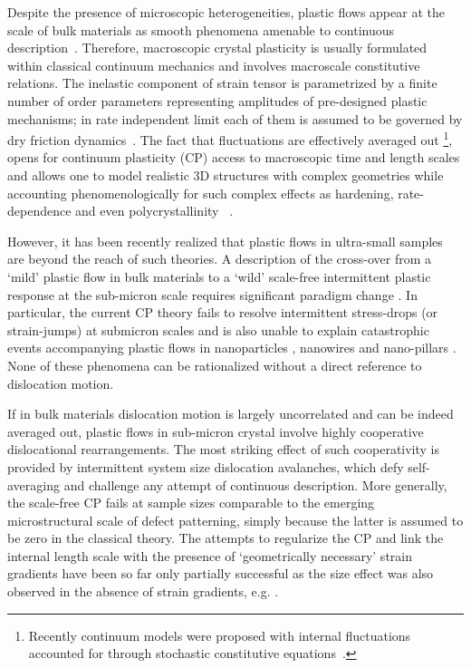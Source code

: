 \documentclass[CRPHYS,Unicode,manuscript]{cedram}
\begin{document}
Despite the presence of microscopic  heterogeneities,  plastic flows appear at the scale of bulk materials as  smooth phenomena amenable to continuous description~\cite{Takeuchi1975-vw}. Therefore,  macroscopic crystal plasticity is usually formulated within classical continuum mechanics and involves macroscale  constitutive relations. The inelastic component of  strain tensor  is parametrized by a finite number of order parameters representing amplitudes of pre-designed plastic mechanisms; in rate independent limit  each of them is assumed to be  governed  by dry  friction  dynamics~\cite{Han2005-uh,Gurtin2009-bl,Roters2010-cw,Stein2018-gr,Forest2019,Salman2021-sb}. The fact that   fluctuations are effectively averaged  out \footnote{Recently continuum  models were proposed with internal fluctuations  accounted for through stochastic constitutive equations~\cite{Weiss2015-eh,Zaiser2019-qm}.},  
opens for continuum plasticity (CP) access to macroscopic time and length scales and allows one to model realistic 3D structures with complex geometries while accounting phenomenologically for such complex effects as hardening, rate-dependence and even polycrystallinity ~\cite{Franciosi1985-cu,Zhang2007-hb,Roters2010-cw,Forest2019-au,Marano2019-yo}. 

However, it has been recently realized that plastic flows in ultra-small samples are beyond the reach of such theories. A description of the cross-over from a `mild' plastic flow in bulk materials to a `wild' scale-free intermittent plastic response at the sub-micron scale requires significant paradigm change \cite{Weiss2015-eh}. In particular, the current CP theory fails to resolve intermittent  stress-drops (or strain-jumps)   at submicron scales \cite{Uchic2004-ax,Dimiduk2006-fz,Zhang2017-cg} and  is also unable to explain catastrophic events  accompanying plastic flows in nanoparticles \cite{wang2012pristine}, nanowires \cite{Lu2011-cu} and nano-pillars \cite{bei2008effects,Issa2015-mq,Hu2018-yn,Zhang2020-ax}. None of these phenomena can be rationalized without a direct reference to dislocation motion. 


If in  bulk materials dislocation  motion is largely uncorrelated and can be indeed averaged out, plastic flows in sub-micron crystal involve  highly cooperative dislocational rearrangements. The most striking effect of such cooperativity is provided by intermittent  system size dislocation avalanches, which defy self-averaging and challenge any attempt of  continuous  description. More generally, the scale-free CP fails at sample sizes comparable to the emerging microstructural scale of defect patterning, simply because the latter is assumed to be  zero in the classical  theory.  The  attempts to regularize the CP and link  the   internal length scale with the presence of `geometrically necessary' strain gradients  have been so far  only partially successful as the size effect was also observed in the absence of strain gradients, e.g. \cite{Bittencourt2019-tg}.
 
\end{document}
